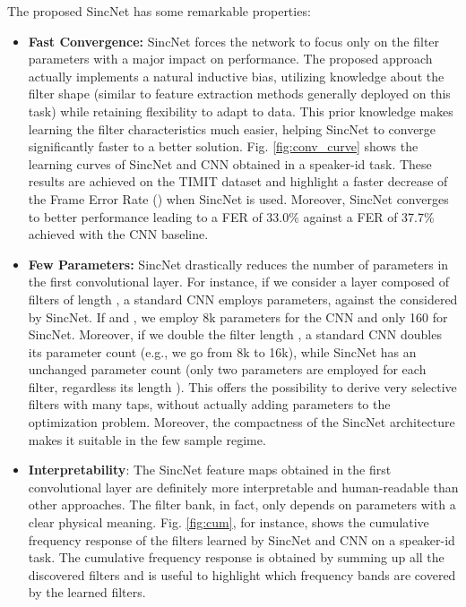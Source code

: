 \documentclass{article}
\begin{document}
 
The proposed SincNet has some remarkable properties:
\begin{itemize}
\item \textbf{Fast Convergence:}
SincNet forces the network to focus only on the filter parameters with a major impact on performance. The proposed approach actually implements a natural inductive bias, utilizing knowledge about the filter shape (similar to feature extraction methods generally deployed on this task) while retaining flexibility to adapt to data. This prior knowledge makes learning the filter characteristics much easier, helping SincNet to converge significantly faster to a better solution.
Fig. \ref{fig:conv_curve} shows the learning curves of SincNet and CNN obtained in a speaker-id task. These results are achieved on the TIMIT dataset and highlight a faster decrease of the Frame Error Rate () when SincNet is used. Moreover, SincNet converges to better performance leading to a FER of 33.0\% against a FER of 37.7\% achieved with the CNN baseline.

\item \textbf{Few Parameters:} SincNet drastically reduces the number of parameters in the first convolutional layer. For instance, if we consider a layer composed of  filters of length , a standard CNN employs  parameters, against the  considered by SincNet. If  and , we employ 8k parameters for the CNN and only 160 for SincNet. Moreover, if we double the filter length , a standard CNN doubles its parameter count (e.g., we go from 8k to 16k), while SincNet has an unchanged parameter count (only two parameters are employed for each filter, regardless its length ). This offers the possibility to derive very selective filters with many taps, without actually adding parameters to the optimization problem. Moreover, the compactness of the SincNet architecture makes it suitable in the few sample regime. 




\item \textbf{Interpretability}: The SincNet feature maps obtained in the first convolutional layer are definitely more interpretable and human-readable than other approaches. The filter bank, in fact, only depends on parameters with a clear physical meaning.
Fig. \ref{fig:cum}, for instance, shows the cumulative frequency response of the filters learned by SincNet and CNN on a speaker-id task. The cumulative frequency response is obtained by summing up all the discovered filters and is useful to highlight which frequency bands are covered by the learned filters. 


\end{itemize}
\end{document}
